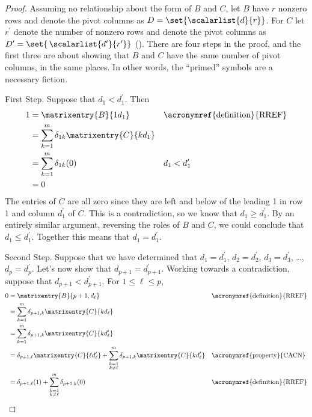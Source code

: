\begin{proof}
%
Assuming no relationship about the form of $B$ and $C$, let $B$ have $r$ nonzero rows and denote the pivot columns as $D=\set{\scalarlist{d}{r}}$.  For $C$ let $r^\prime$ denote the number of nonzero rows and denote the pivot columns
as
$D^\prime=\set{\,\scalarlist{d^\prime}{r^\prime}}$ ().  There are four steps in the proof, and the first three are about showing that $B$ and $C$ have the same number of pivot columns, in the same places.  In other words, the ``primed'' symbols are a necessary fiction.\par
%
First Step.  Suppose that $d_1<d^\prime_1$.  Then
%
\begin{align*}
1
&=\matrixentry{B}{1d_1}
&&\text{\acronymref{definition}{RREF}}\\
%
&=\sum_{k=1}^{m}\delta_{1k}\matrixentry{C}{kd_1}\\
%
&=\sum_{k=1}^{m}\delta_{1k}(0)
&&d_1<d^\prime_1\\
%
&=0
\end{align*}
%
The entries of $C$ are all zero since they are left and below of the leading 1 in row 1 and column $d^\prime_1$ of $C$.  This is a contradiction, so we know that $d_1\geq d^\prime_1$.  By an entirely similar argument, reversing the roles of $B$ and $C$, we could conclude that $d_1\leq d^\prime_1$.  Together this means that $d_1=d^\prime_1$.\par
%
Second Step.  Suppose that we have determined that $d_1=d^\prime_1$, $d_2=d^\prime_2$, $d_3=d^\prime_3$, \dots, $d_p=d^\prime_p$.  Let's now show that $d_{p+1}=d^\prime_{p+1}$.  Working towards a contradiction, suppose that $d_{p+1}<d^\prime_{p+1}$.  For $1\leq\ell\leq p$,
%
\begin{align*}
0
&=\matrixentry{B}{p+1,d_\ell}
&&\text{\acronymref{definition}{RREF}}\\
%
&=\sum_{k=1}^{m}\delta_{p+1,k}\matrixentry{C}{kd_\ell}\\
%
&=\sum_{k=1}^{m}\delta_{p+1,k}\matrixentry{C}{kd^\prime_\ell}\\
%
&=
\delta_{p+1,\ell}\matrixentry{C}{\ell d^\prime_\ell}+
\sum_{\substack{k=1\\k\neq\ell}}^{m}\delta_{p+1,k}\matrixentry{C}{kd^\prime_\ell}
&&\text{\acronymref{property}{CACN}}\\
%
&=
\delta_{p+1,\ell}(1)+
\sum_{\substack{k=1\\k\neq\ell}}^{m}\delta_{p+1,k}(0)
&&\text{\acronymref{definition}{RREF}}\\

\end{align*}
\end{proof}
